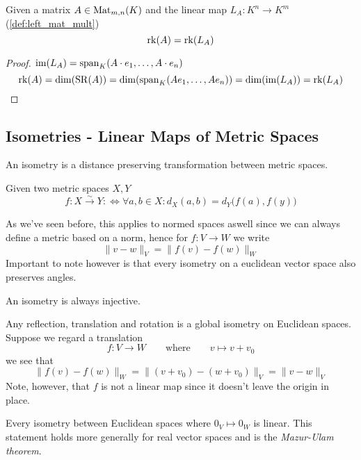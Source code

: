 \begin{theorem}[\(\rk(A) = \rk(L_A)\)]
   Given a matrix \(A \in \operatorname{Mat}_{m,n}(K)\) and the linear map \(L_{A}: K^n \to K^m\) (\ref{def:left_mat_mult})
   \[\operatorname{rk}(A) = \operatorname{rk}(L_A)\]
\end{theorem}
\begin{proof}
   \(\operatorname{im}(L_{A}) = \operatorname{span}_K(A \cdot e_1, \ldots, A \cdot e_n)\)
   \[\operatorname{rk}(A) = \dim(\operatorname{SR}(A)) = \dim(\operatorname{span}_K(Ae_1, \ldots, Ae_n)) = \dim(\operatorname{im}(L_{A})) = \operatorname{rk}(L_{A})\]
\end{proof}

\subsection{Isometries - Linear Maps of Metric Spaces}
An isometry is a distance preserving transformation between metric spaces.
\begin{definition}[Isometry]
   Given two metric spaces \(X, Y\)
   \[f: X \xrightarrow{\sim} Y :\iff \forall a, b \in X: d_X(a, b) = d_Y\big(f(a), f(y)\big)\]
\end{definition}
\begin{remark}
   As we've seen before, this applies to normed spaces aswell since we can always define a metric based on a norm, hence for \(f: V \to W\) we write
   \[\|v - w\|_V = \|f(v) - f(w)\|_W\]
   Important to note however is that every isometry on a euclidean vector space also preserves angles.
\end{remark}
\begin{remark}
   An isometry is always injective.
\end{remark}
\begin{example}
   Any reflection, translation and rotation is a global isometry on Euclidean spaces.
   Suppose we regard a translation
   \[f: V \to W \qquad\text{where}\qquad v \mapsto v + v_0\]
   we see that
   \[\|f(v) - f(w)\|_W = \|(v + v_0) - (w + v_0)\|_V = \|v - w\|_V\]
   Note, however, that \(f\) is not a linear map since it doesn't leave the origin in place.
\end{example}

Every isometry between Euclidean spaces where \(0_V \mapsto 0_W\) is linear.
This statement holds more generally for real vector spaces and is the \emph{Mazur-Ulam theorem}.


